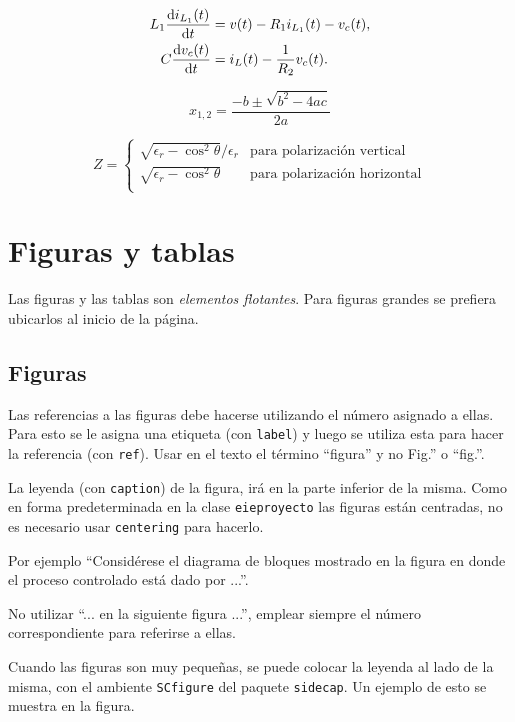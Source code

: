 \begin{align}
	L_1 \frac{\mathrm{d} i_{L_1} (t)}{\mathrm{d} t} &= v(t) - R_1 i_{L_1}(t) - v_c(t), \\
	C \frac{\mathrm{d} v_c (t)}{\mathrm{d} t} &= i_L(t)- \frac{1}{R_2} v_c(t).
\end{align}

\begin{equation}
x_{1,2} = \frac{-b \pm \sqrt{b^2 - 4ac}}{2a}
\end{equation}

\begin{equation}
Z = \begin{cases}
\sqrt{\epsilon_r - \cos^2 \theta}/\epsilon_r & \text{para polarización vertical} \\
\sqrt{\epsilon_r - \cos^2 \theta} & \text{para polarización horizontal} \\
\end{cases}
\end{equation}


\section{Figuras y tablas}

Las figuras y las tablas son \emph{elementos flotantes}. Para figuras grandes se prefiera ubicarlos al inicio de la página.

\subsection{Figuras}
Las referencias a las figuras debe hacerse utilizando el número asignado a ellas.  Para esto se le asigna una etiqueta (con \texttt{label}) y luego se utiliza esta para hacer la referencia (con \texttt{ref}).  Usar en el texto el término ``figura'' y no Fig.'' o ``fig.''.

La leyenda (con \texttt{caption}) de la figura, irá en la parte inferior de la misma.  Como en forma predeterminada en la clase \texttt{eieproyecto} las figuras están centradas, no es necesario usar \texttt{centering} para hacerlo.

Por ejemplo ``Considérese el diagrama de bloques mostrado en la figura en donde el proceso controlado está dado por ...''.

No utilizar ``... en la siguiente figura ...'', emplear siempre el número correspondiente para referirse a ellas.

Cuando las figuras son muy pequeñas, se puede colocar la leyenda al lado de la misma, con el ambiente \texttt{SCfigure} del paquete \texttt{sidecap}.  Un ejemplo de esto se muestra en la figura.

